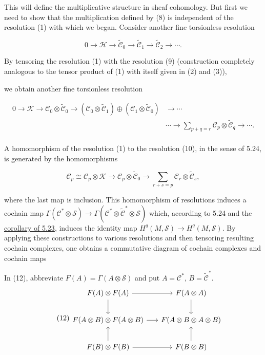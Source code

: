 This will define the multiplicative structure in sheaf cohomology. But first we need to show that the multiplication defined by (8) is independent of the resolution (1) with which we began. Consider another fine torsionless resolution

\begin{equation}
\tag{9}\label{eq:5.42:9}
0\to\mathcal{H}\to\widetilde{\mathcal{C}}_{0}\to\widetilde{\mathcal{C}}_{1}\to\widetilde{\mathcal{C}}_{2}\to\cdots.
\end{equation}

By tensoring the resolution (1) with the resolution (9) (construction completely analogous to the tensor product of (1) with itself given in (2) and (3)),

we obtain another fine torsionless resolution

\begin{equation}
\tag{10}\label{eq:5.42:10}
\begin{aligned}{0\to\mathcal{K}\to\mathcal{C}_{0}\otimes\widetilde{\mathcal{C}}_{0}\to(\mathcal{C}_{0}\otimes\widetilde{\mathcal{C}}_{1})\oplus(\mathcal{C}_{1}\otimes\widetilde{\mathcal{C}}_{0})}&{{}\to\cdots}\\ {}&{{}\cdots\to\sum_{p+q=r}\mathcal{C}_{p}\otimes\widetilde{\mathcal{C}}_{q}\to\cdots.}\\ \end{aligned}
\end{equation}

A homomorphism of the resolution (1) to the resolution (10), in the sense of 5.24, is generated by the homomorphisms

\begin{equation}
\tag{11}\label{eq:5.42:11}
\mathcal{C}_{p}\cong\mathcal{C}_{p}\otimes\mathcal{K}\to\mathcal{C}_{p}\otimes\widetilde{\mathcal{C}}_{0}\to\sum_{r+s=p}\mathcal{C}_{r}\otimes\widetilde{\mathcal{C}}_{s},
\end{equation}

where the last map is inclusion. This homomorphism of resolutions induces a cochain map $\Gamma(\mathcal{C}^* \otimes \mathcal{S}) \to \Gamma(\mathcal{C}^* \otimes \widetilde{\mathcal{C}}^* \otimes \mathcal{S})$ which, according to 5.24 and the \hyperref[thm:5.23]{corollary of 5.23}, induces the identity map $H^q(M, \mathcal{S}) \to H^q(M, \mathcal{S})$. By applying these constructions to various resolutions and then tensoring resulting cochain complexes, one obtains a commutative diagram of cochain complexes and cochain maps

In (12), abbreviate $F(A)=\Gamma(A\otimes\mathcal S)$ and put
$A=\mathcal C^*$, $B=\widetilde{\mathcal C}^*$.
\begin{equation}
\tag{12}\label{eq:5.42:12}
\begin{tikzcd}[ampersand replacement=\&, column sep=1.6em,row sep=2em]
F(A)\otimes F(A) \arrow[r] \arrow[d] \& F(A\otimes A) \arrow[d] \\
F(A\otimes B)\otimes F(A\otimes B) \arrow[r] \& F(A\otimes B\otimes A\otimes B) \\
F(B)\otimes F(B) \arrow[r] \arrow[u] \& F(B\otimes B) \arrow[u]
\end{tikzcd}
\end{equation}

